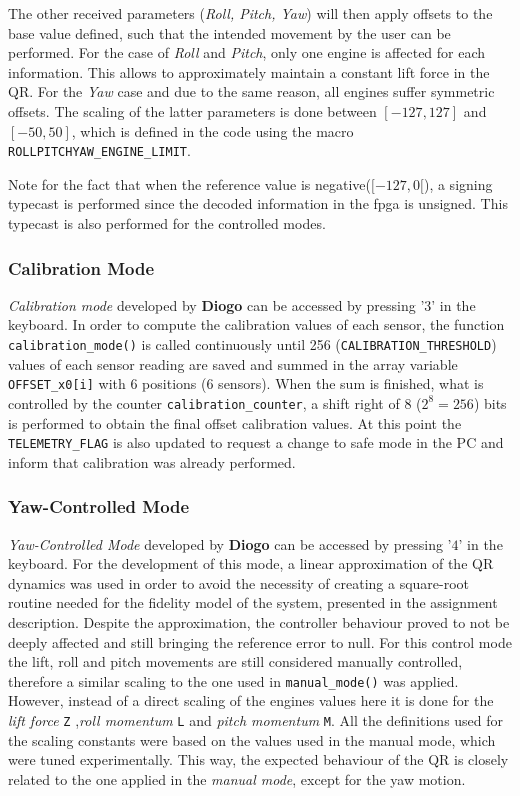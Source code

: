 \documentclass{article}
\begin{document}
The other received parameters (\textit{Roll, Pitch, Yaw}) will then apply offsets to the base value defined, such that the intended movement by the user can be performed. For the case of \textit{Roll} and \textit{Pitch}, only one engine is affected for each information. This allows to approximately maintain a constant lift force in the QR. For the \textit{Yaw} case and due to the same reason, all engines suffer symmetric offsets. The scaling of the latter parameters is done between $[-127,127]$ and $[-50,50]$, which is defined in the code using the macro \texttt{ROLLPITCHYAW\_ENGINE\_LIMIT}. 

Note for the fact that when the reference value is negative($[-127,0[$), a signing typecast is performed since the decoded information in the fpga is unsigned. This typecast is also performed for the controlled modes.

\subsubsection{Calibration Mode}
\textit{Calibration mode} developed by \textbf{Diogo} can be accessed by pressing '$3$' in the keyboard. In order to compute the calibration values of each sensor, the function \texttt{calibration\_mode()} is called continuously until 256 (\texttt{CALIBRATION\_THRESHOLD}) values of each sensor reading are saved and summed in the array variable \texttt{OFFSET\_x0[i]} with 6 positions (6 sensors). When the sum is finished, what is controlled by the counter \texttt{calibration\_counter}, a shift right of $8$ ($2^8=256$) bits is performed to obtain the final offset calibration values. At this point the \texttt{TELEMETRY\_FLAG} is also updated to request a change to safe mode in the PC and inform that calibration was already performed.

\subsubsection{Yaw-Controlled Mode}
\textit{Yaw-Controlled Mode} developed by \textbf{Diogo} can be accessed by pressing '$4$' in the keyboard. For the development of this mode, a linear approximation of the QR dynamics was used in order to avoid the necessity of creating a square-root routine needed for the fidelity model of the system, presented in the assignment description. Despite the approximation, the controller behaviour proved to not be deeply affected and still bringing the reference error to null.
For this control mode the lift, roll and pitch movements are still considered manually controlled, therefore a similar scaling to the one used in \texttt{manual\_mode()} was applied. However, instead of a direct scaling of the engines values here it is done for the \textit{lift force} \texttt{Z} ,\textit{roll momentum} \texttt{L} and \textit{pitch momentum} \texttt{M}. All the definitions used for the scaling constants were based on the values used in the manual mode, which were tuned experimentally. This way, the expected behaviour of the QR is closely related to the one applied in the \textit{manual mode}, except for the yaw motion.
\end{document}
